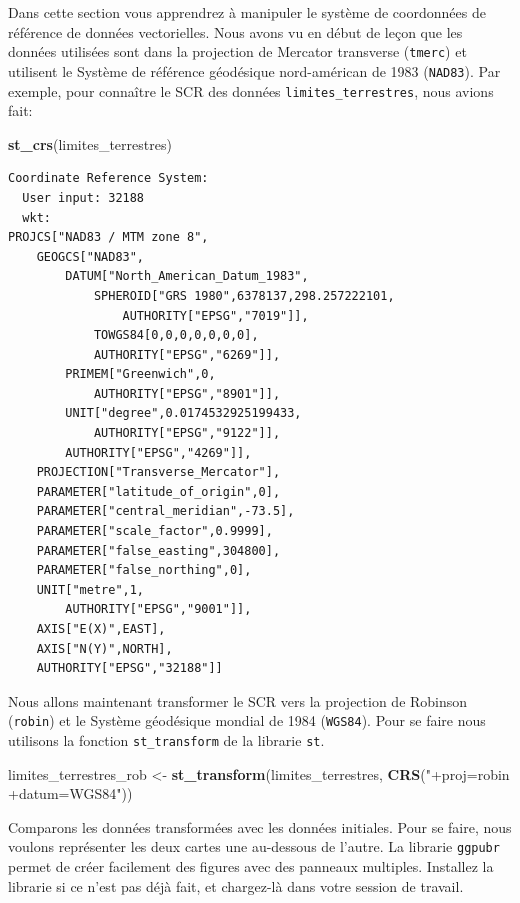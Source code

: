 \documentclass[
  12pt,
]{krantz}
\newenvironment{Shaded}{\begin{snugshade}}{\end{snugshade}}
\newcommand{\KeywordTok}[1]{\textcolor[rgb]{0.13,0.29,0.53}{\textbf{#1}}}
\newcommand{\NormalTok}[1]{#1}
\newcommand{\StringTok}[1]{\textcolor[rgb]{0.31,0.60,0.02}{#1}}
\begin{document}
Dans cette section vous apprendrez à manipuler le système de coordonnées de référence de données vectorielles. Nous avons vu en début de leçon que les données utilisées sont dans la projection de Mercator transverse (\texttt{tmerc}) et utilisent le Système de référence géodésique nord-américan de 1983 (\texttt{NAD83}). Par exemple, pour connaître le SCR des données \texttt{limites\_terrestres}, nous avions fait:

\begin{Shaded}
\begin{Highlighting}[]
\KeywordTok{st_crs}\NormalTok{(limites_terrestres)}
\end{Highlighting}
\end{Shaded}

\begin{verbatim}
Coordinate Reference System:
  User input: 32188 
  wkt:
PROJCS["NAD83 / MTM zone 8",
    GEOGCS["NAD83",
        DATUM["North_American_Datum_1983",
            SPHEROID["GRS 1980",6378137,298.257222101,
                AUTHORITY["EPSG","7019"]],
            TOWGS84[0,0,0,0,0,0,0],
            AUTHORITY["EPSG","6269"]],
        PRIMEM["Greenwich",0,
            AUTHORITY["EPSG","8901"]],
        UNIT["degree",0.0174532925199433,
            AUTHORITY["EPSG","9122"]],
        AUTHORITY["EPSG","4269"]],
    PROJECTION["Transverse_Mercator"],
    PARAMETER["latitude_of_origin",0],
    PARAMETER["central_meridian",-73.5],
    PARAMETER["scale_factor",0.9999],
    PARAMETER["false_easting",304800],
    PARAMETER["false_northing",0],
    UNIT["metre",1,
        AUTHORITY["EPSG","9001"]],
    AXIS["E(X)",EAST],
    AXIS["N(Y)",NORTH],
    AUTHORITY["EPSG","32188"]]
\end{verbatim}

Nous allons maintenant transformer le SCR vers la projection de Robinson (\texttt{robin}) et le Système géodésique mondial de 1984 (\texttt{WGS84}). Pour se faire nous utilisons la fonction \texttt{st\_transform} de la librarie \texttt{st}.

\begin{Shaded}
\begin{Highlighting}[]
\NormalTok{limites_terrestres_rob <-}\StringTok{ }\KeywordTok{st_transform}\NormalTok{(limites_terrestres,}
    \KeywordTok{CRS}\NormalTok{(}\StringTok{"+proj=robin +datum=WGS84"}\NormalTok{))}
\end{Highlighting}
\end{Shaded}

Comparons les données transformées avec les données initiales. Pour se faire, nous voulons représenter les deux cartes une au-dessous de l'autre. La librarie \texttt{ggpubr} permet de créer facilement des figures avec des panneaux multiples. Installez la librarie si ce n'est pas déjà fait, et chargez-là dans votre session de travail.
\end{document}
